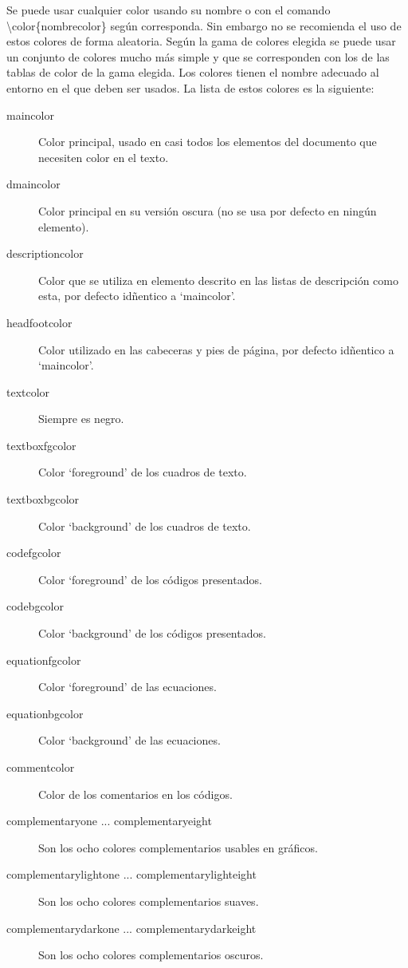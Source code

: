 Se puede usar cualquier color usando su nombre o con el comando \textbackslash color\{nombrecolor\} según corresponda. Sin embargo no se recomienda el uso de estos colores de forma aleatoria. Según la gama de colores elegida se puede usar un conjunto de colores mucho más simple y que se corresponden con los de las tablas de color de la gama elegida. Los colores tienen el nombre adecuado al entorno en el que deben ser usados. La lista de estos colores es la siguiente:

\begin{description}
  \item [maincolor] Color principal, usado en casi todos los elementos del documento que necesiten color en el texto.
  \item [dmaincolor] Color principal en su versión oscura (no se usa por defecto en ningún elemento).
  \item [descriptioncolor] Color que se utiliza en elemento descrito en las listas de descripción como esta, por defecto idñentico a `maincolor'.
  \item [headfootcolor] Color utilizado en las cabeceras y pies de página, por defecto idñentico a `maincolor'.
  \item [textcolor] Siempre es negro.
  \item [textboxfgcolor] Color `foreground' de los cuadros de texto.
  \item [textboxbgcolor]  Color `background' de los cuadros de texto.
  \item [codefgcolor] Color `foreground' de los códigos presentados.
  \item [codebgcolor] Color `background' de los códigos presentados.
  \item [equationfgcolor] Color `foreground' de las ecuaciones.
  \item [equationbgcolor] Color `background' de las ecuaciones.
  \item [commentcolor] Color de los comentarios en los códigos.
  \item [complementaryone ... complementaryeight] Son los ocho colores complementarios usables en gráficos.
  \item [complementarylightone ... complementarylighteight] Son los ocho colores complementarios suaves.
  \item [complementarydarkone ... complementarydarkeight] Son los ocho colores complementarios oscuros.
\end{description}
